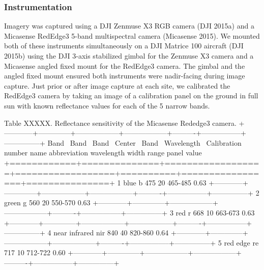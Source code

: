 \documentclass[]{article}
\begin{document}
\subsubsection{Instrumentation}\label{instrumentation}

Imagery was captured using a DJI Zenmuse X3 RGB camera (DJI 2015a) and a
Micasense RedEdge3 5-band multispectral camera (Micasense 2015). We
mounted both of these instruments simultaneously on a DJI Matrice 100
aircraft (DJI 2015b) using the DJI 3-axis stabilized gimbal for the
Zenmuse X3 camera and a Micasense angled fixed mount for the RedEdge3
camera. The gimbal and the angled fixed mount ensured both instruments
were nadir-facing during image capture. Just prior or after image
capture at each site, we calibrated the RedEdge3 camera by taking an
image of a calibration panel on the ground in full sun with known
reflectance values for each of the 5 narrow bands.

Table XXXXX. Reflectance sensitivity of the Micasense Rededge3 camera.
+------------+--------------+------------------+------------------+----------+-----------------+---------------+
\textbar{} Band~ \textbar{} Band~ \textbar{} Band~ \textbar{} Center~
\textbar{} Band~ \textbar{} Wavelength~ \textbar{} Calibration~
\textbar{} \textbar{} number \textbar{} name \textbar{} abbreviation
\textbar{} wavelength \textbar{} width \textbar{} range \textbar{} panel
value \textbar{}
+============+==============+==================+==================+==========+=================+===============+
\textbar{} 1 \textbar{}blue \textbar{}b \textbar{} 475 \textbar{} 20
\textbar{} 465-485 \textbar{} 0.63 \textbar{}
+------------+--------------+------------------+------------------+----------+-----------------+---------------+
\textbar{} 2 \textbar{}green \textbar{}g \textbar{} 560 \textbar{} 20
\textbar{} 550-570 \textbar{} 0.63 \textbar{}
+------------+--------------+------------------+------------------+----------+-----------------+---------------+
\textbar{} 3 \textbar{}red \textbar{}r \textbar{} 668 \textbar{} 10
\textbar{} 663-673 \textbar{} 0.63 \textbar{}
+------------+--------------+------------------+------------------+----------+-----------------+---------------+
\textbar{} 4 \textbar{}near infrared \textbar{}nir \textbar{} 840
\textbar{} 40 \textbar{} 820-860 \textbar{} 0.64 \textbar{}
+------------+--------------+------------------+------------------+----------+-----------------+---------------+
\textbar{} 5 \textbar{}red edge \textbar{}re \textbar{} 717 \textbar{}
10 \textbar{} 712-722 \textbar{} 0.60 \textbar{}
+------------+--------------+------------------+------------------+----------+-----------------+---------------+
\end{document}
